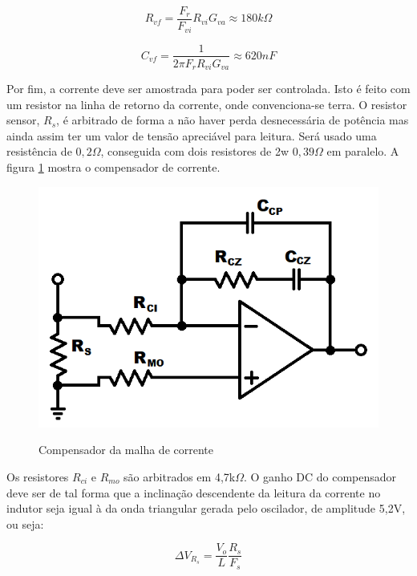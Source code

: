 \documentclass[
        12pt,
        openany, %
        oneside, %
        a4paper,			
        english,			
        brazil
        ]{abntbibufjf}
\begin{document}
\begin{equation}
R_{vf}=\frac{F_r}{F_{vi}}R_{vi}G_{va}\approx 180k \Omega
\end{equation}

\begin{equation}
C_{vf}=\frac{1}{2\pi F_r R_{vi}G_{va}}\approx 620 nF
\end{equation}

Por fim, a corrente deve ser amostrada para poder ser controlada. Isto é feito com um resistor na linha de retorno da corrente, onde convenciona-se terra. O resistor sensor, $R_s$, é arbitrado de forma a não haver perda desnecessária de potência mas ainda assim ter um valor de tensão apreciável para leitura. Será usado uma resistência de $0,2\Omega$, conseguida com dois resistores de 2w $0,39\Omega$ em paralelo. A figura \ref{vci} mostra o compensador de corrente.

\begin{figure}[!h]
	\centering
	\caption{Compensador da malha de corrente}
	\includegraphics[scale=.5]{../ESQUEMAS/vci.png}\\
	\label{vci}
\end{figure}

Os resistores $R_{ci}$ e $R_{mo}$ são arbitrados em 4,7k$\Omega$. O ganho DC do compensador deve ser de tal forma que a inclinação descendente da leitura da corrente no indutor seja igual à da onda triangular gerada pelo oscilador, de amplitude 5,2V, ou seja:

\begin{equation}
\Delta V_{R_s}=\frac{V_o}{L}\frac{R_s}{F_s}
\end{equation}
\end{document}
